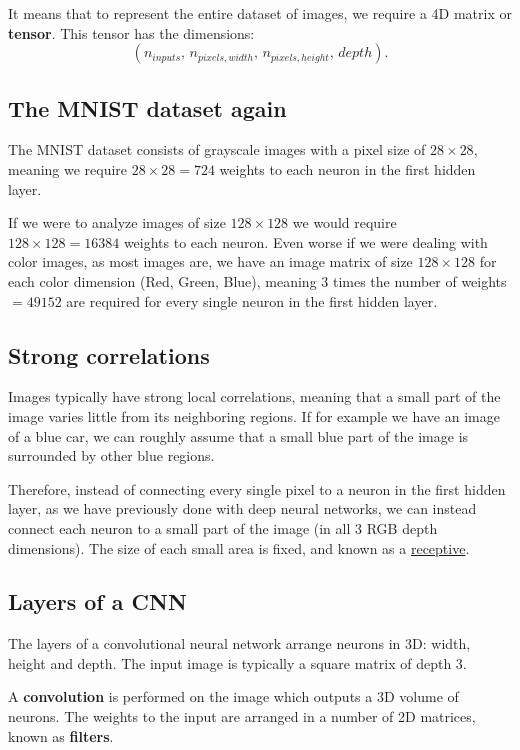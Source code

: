 \documentclass[%
oneside,                 %
final,                   %
10pt]{article}
\begin{document}
It means that to represent the entire
dataset of images, we require a 4D matrix or \textbf{tensor}. This tensor has the dimensions:  
\[  
(n_{inputs},\, n_{pixels, width},\, n_{pixels, height},\, depth) .
\]

\subsection*{The MNIST dataset again}

The MNIST dataset consists of grayscale images with a pixel size of
$28\times 28$, meaning we require $28 \times 28 = 724$ weights to each
neuron in the first hidden layer.

If we were to analyze images of size $128\times 128$ we would require
$128 \times 128 = 16384$ weights to each neuron. Even worse if we were
dealing with color images, as most images are, we have an image matrix
of size $128\times 128$ for each color dimension (Red, Green, Blue),
meaning 3 times the number of weights $= 49152$ are required for every
single neuron in the first hidden layer.


\subsection*{Strong correlations}

Images typically have strong local correlations, meaning that a small
part of the image varies little from its neighboring regions. If for
example we have an image of a blue car, we can roughly assume that a
small blue part of the image is surrounded by other blue regions.

Therefore, instead of connecting every single pixel to a neuron in the
first hidden layer, as we have previously done with deep neural
networks, we can instead connect each neuron to a small part of the
image (in all 3 RGB depth dimensions).  The size of each small area is
fixed, and known as a \href{{https://en.wikipedia.org/wiki/Receptive_field}}{receptive}.


\subsection*{Layers of a CNN}
The layers of a convolutional neural network arrange neurons in 3D: width, height and depth.  
The input image is typically a square matrix of depth 3. 

A \textbf{convolution} is performed on the image which outputs
a 3D volume of neurons. The weights to the input are arranged in a number of 2D matrices, known as \textbf{filters}.
\end{document}
